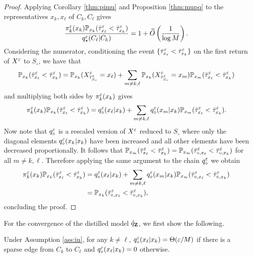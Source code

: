 \begin{proof}
Applying Corollary \ref{thm:pimu} and Proposition \ref{thm:mupq} to the representatives $x_k,x_\ell$ of $C_k,C_\ell$ gives
\begin{equation*}
\frac{\pi_k^\varepsilon(x_k)\mathbb{P}_{x_k}(\bar{\tau}_{x_\ell}^\varepsilon < \bar{\tau}_{x_k}^\varepsilon)}{q_\star^\varepsilon(C_\ell|C_k)} = 1+\widetilde{O}\left(\frac{1}{\log M}\right).
\end{equation*}
Considering the numerator, conditioning the event $\{\bar{\tau}_{x_\ell}^\varepsilon < \bar{\tau}_{x_k}^\varepsilon\}$ on the first return of $X^\varepsilon$ to $S_\circ$, we have that
\begin{align*}
\mathbb{P}_{x_k}(\bar{\tau}_{x_\ell}^\varepsilon < \bar{\tau}_{x_k}^\varepsilon) = \mathbb{P}_{x_k}(X_{\bar{\tau}_{S_\circ}^\varepsilon}^\varepsilon = x_\ell) + \sum_{m\neq k,\ell} \mathbb{P}_{x_k}(X_{\bar{\tau}_{S_\circ}^\varepsilon}^\varepsilon = x_m) \mathbb{P}_{x_m}(\bar{\tau}_{x_\ell}^\varepsilon < \bar{\tau}_{x_k}^\varepsilon)
\end{align*}
and multiplying both sides by $\pi_k^\varepsilon(x_k)$ gives
\begin{align*}
\pi_k^\varepsilon(x_k)\mathbb{P}_{x_k}(\bar{\tau}_{x_\ell}^\varepsilon < \bar{\tau}_{x_k}^\varepsilon) = q_\circ^\varepsilon(x_\ell|x_k) + \sum_{m\neq k,\ell} q_\circ^\varepsilon(x_m|x_k) \mathbb{P}_{x_m}(\bar{\tau}_{x_\ell}^\varepsilon < \bar{\tau}_{x_k}^\varepsilon).
\end{align*}
Now note that $q_\circ^\varepsilon$ is a rescaled version of $X^\varepsilon$ reduced to $S_\circ$ where only the diagonal elements $q_\circ^\varepsilon(x_k|x_k)$ have been increased and all other elements have been decreased proportionally. It follows that $\mathbb{P}_{x_m}(\bar{\tau}_{x_\ell}^\varepsilon < \bar{\tau}_{x_k}^\varepsilon) = \mathbb{P}_{x_m}(\bar{\tau}_{\circ,x_\ell}^\varepsilon < \bar{\tau}_{\circ,x_k}^\varepsilon)$ for all $m\neq k,\ell$. Therefore applying the same argument to the chain $q_\circ^\varepsilon$ we obtain
\begin{align*}
\pi_k^\varepsilon(x_k)\mathbb{P}_{x_k}(\bar{\tau}_{x_\ell}^\varepsilon < \bar{\tau}_{x_k}^\varepsilon) &= q_\circ^\varepsilon(x_\ell|x_k) + \sum_{m\neq k,\ell} q_\circ^\varepsilon(x_m|x_k) \mathbb{P}_{x_m}(\bar{\tau}_{\circ,x_\ell}^\varepsilon < \bar{\tau}_{\circ,x_k}^\varepsilon)\\
&=\mathbb{P}_{x_k}(\bar{\tau}_{\circ,x_\ell}^\varepsilon < \bar{\tau}_{\circ,x_k}^\varepsilon),
\end{align*}
concluding the proof.
\end{proof}


For the convergence of the distilled model $\hat{q}_{\mathbf{Z}}$, we first show the following.

\begin{lemma}
Under Assumption \ref{ass:in}, for any $k\ne\ell$, $q_\circ^\varepsilon(x_\ell|x_k) = \Theta(\varepsilon/M)$ if there is a sparse edge from $C_k$ to $C_\ell$ and $q_\circ^\varepsilon(x_\ell|x_k) = 0$ otherwise.
\end{lemma}

